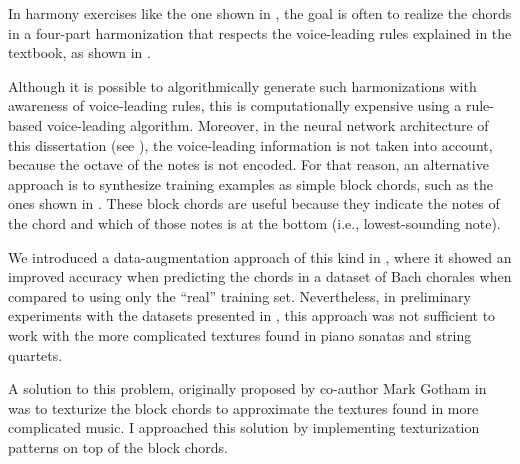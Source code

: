 
In harmony exercises like the one shown in
, the goal is often to
\gls{realize} the chords in a four-part harmonization that
respects the voice-leading rules explained in the textbook,
as shown in . 


Although it is possible to algorithmically generate such
harmonizations with awareness of voice-leading rules, this
is computationally expensive using a rule-based
voice-leading
algorithm.
Moreover, in the neural network architecture of this
dissertation (see ), the voice-leading
information is not taken into account, because the octave of
the notes is not encoded. For that reason, an alternative
approach is to synthesize training examples as simple block
chords, such as the ones shown in
. These block chords are useful
because they indicate the notes of the chord and which of
those notes is at the bottom (i.e., lowest-sounding note). 

We introduced a data-augmentation approach of this kind in
\textcite{napoleslopez2020harmonic}, where it showed an
improved accuracy when predicting the chords in a dataset of
Bach chorales when compared to using only the ``real''
training set. Nevertheless, in preliminary experiments with
the datasets presented in
, this approach was not
sufficient to work with the more complicated textures found
in piano sonatas and string quartets.


A solution to this problem, originally proposed by co-author
Mark Gotham in \textcite{napoleslopez2021augmentednet} was
to texturize the block chords to approximate the textures
found in more complicated music. I approached this solution
by implementing texturization patterns on top of the block
chords.

